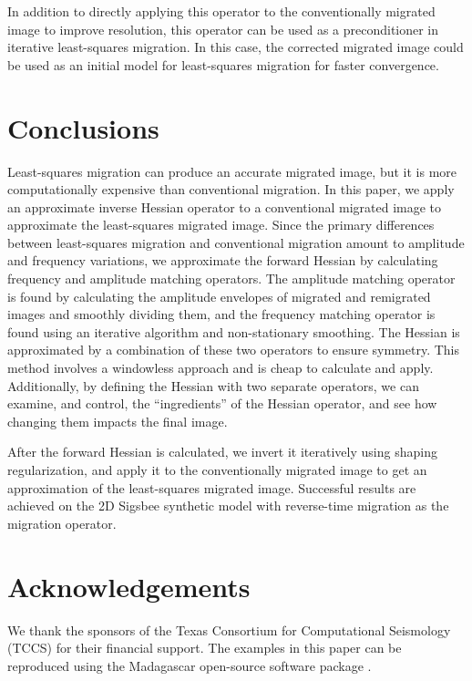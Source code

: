     In addition to directly applying this operator to the conventionally migrated image to improve resolution, this operator can be used as a preconditioner in iterative least-squares migration.
    In this case, the corrected migrated image could be used as an initial model for least-squares migration for faster convergence.

\section{Conclusions}
    Least-squares migration can produce an accurate migrated image, but it is more computationally expensive than conventional migration.
    In this paper, we apply an approximate inverse Hessian operator to a conventional migrated image to approximate the least-squares migrated image.
    Since the primary differences between least-squares migration and conventional migration amount to amplitude and frequency variations, we approximate the forward Hessian by calculating frequency and amplitude matching operators.
    The amplitude matching operator is found by calculating the amplitude envelopes of migrated and remigrated images and smoothly dividing them, and the frequency matching operator is found using an iterative algorithm and non-stationary smoothing.
    The Hessian is approximated by a combination of these two operators to ensure symmetry.
    This method involves a windowless approach and is cheap to calculate and apply.
    Additionally, by defining the Hessian with two separate operators, we can examine, and control, the ``ingredients'' of the Hessian operator, and see how changing them impacts the final image.

    After the forward Hessian is calculated, we invert it iteratively using shaping regularization, and apply it to the conventionally migrated image to get an approximation of the least-squares migrated image.
    Successful results are achieved on the 2D Sigsbee synthetic model with reverse-time migration as the migration operator.


\section{Acknowledgements}
    We thank the sponsors of the Texas Consortium for Computational Seismology (TCCS) for their financial support.
    The examples in this paper can be reproduced using the Madagascar open-source software package \cite[]{madagascar}.
